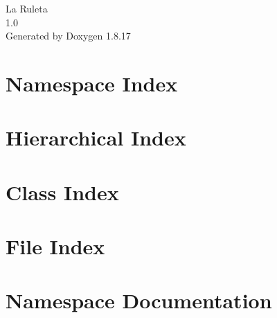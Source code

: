 \let\mypdfximage\pdfximage\def\pdfximage{\immediate\mypdfximage}\documentclass[twoside]{book}
\newcommand{\+}{\discretionary{\mbox{\scriptsize$\hookleftarrow$}}{}{}}
\newcommand{\clearemptydoublepage}{%
  \newpage{\pagestyle{empty}\cleardoublepage}%
}
\begin{document}
\hypersetup{pageanchor=false,
             bookmarksnumbered=true,
             pdfencoding=unicode
            }
\begin{titlepage}
\vspace*{7cm}
\begin{center}%
{\Large La Ruleta \\[1ex]\large 1.\+0 }\\
\vspace*{1cm}
{\large Generated by Doxygen 1.8.17}\\
\end{center}
\end{titlepage}
\clearemptydoublepage
{}
\tableofcontents
\clearemptydoublepage
{}
\hypersetup{pageanchor=true}

\chapter{Namespace Index}

\chapter{Hierarchical Index}

\chapter{Class Index}

\chapter{File Index}

\chapter{Namespace Documentation}







\end{document}
